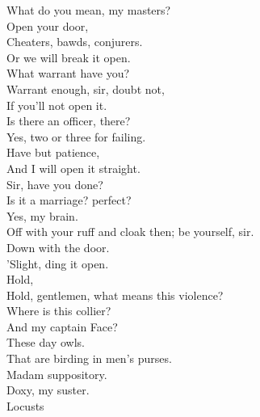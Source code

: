 \documentclass[a4paper,oneside]{memoir}
\begin{document}
\begin{drama*}
\lovewitspeaks What do you mean, my masters?\\
\mammonspeaks {} Open your door,\\
Cheaters, bawds, conjurers.\\
\officeronespeaks {} Or we will break it open.\\
\lovewitspeaks {} What warrant have you?\\
\officeronespeaks {} Warrant enough, sir, doubt not,\\
If you'll not open it.\\
\lovewitspeaks {} Is there an officer, there?\\
\officeronespeaks {} Yes, two or three for failing.\\
\lovewitspeaks Have but patience,\\
And I will open it straight.\\
\facespeaks {} Sir, have you done?\\
Is it a marriage? perfect?\\
\lovewitspeaks {} Yes, my brain.\\
\facespeaks Off with your ruff and cloak then; be yourself, sir.\\
\surlyspeaks {} Down with the door.\\
\kastrilspeaks {} 'Slight, ding it open.\\
\lovewitspeaks {} Hold,\\
Hold, gentlemen, what means this violence?\\
\mammonspeaks Where is this collier?\\
\surlyspeaks {} And my captain Face?\\
\mammonspeaks These day owls.\\
\surlyspeaks {} That are birding in men's purses.\\
\mammonspeaks Madam suppository.\\
\kastrilspeaks {} Doxy, my suster.\\
\ananiasspeaks Locusts\\

\end{drama*}
\end{document}
